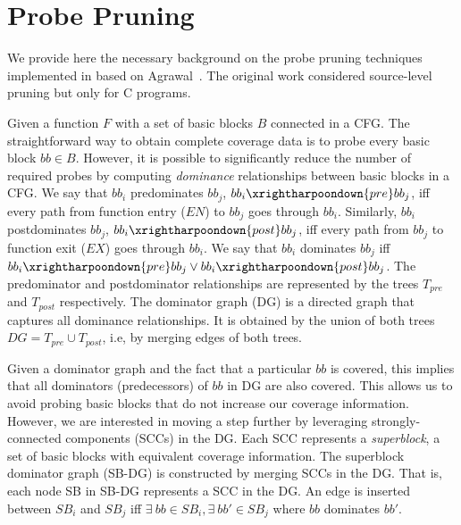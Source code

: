 
\section{Probe Pruning}
\label{sec:probe-pruning}

We provide here the necessary background on the probe pruning techniques implemented in {\bcov} based on Agrawal~\cite{Agrawal1994}. 
The original work considered source-level pruning but only for C programs.

Given a function $F$ with a set of basic blocks $B$ connected in a CFG. 
The straightforward way to obtain complete coverage data is to probe every basic block $bb \in B$. 
However, it is possible to significantly reduce the number of required probes by computing \textit{dominance} relationships between basic blocks in a CFG. 
We say that $bb_i$ predominates $bb_j$, $bb_i\xrightharpoondown{pre}bb_j $, iff every path from function entry ($EN$) to $bb_j$ goes through $bb_i$.
Similarly, $bb_i$ postdominates $bb_j$, $bb_i\xrightharpoondown{post}bb_j $, iff every path from $bb_j$ to function exit ($EX$) goes through $bb_i$. 
We say that $bb_i$ dominates $bb_j$ iff \mbox{$bb_i\xrightharpoondown{pre}bb_j \vee bb_i\xrightharpoondown{post}bb_j $}. 
The predominator and postdominator relationships are represented by the trees $T_{pre} $ and $T_{post} $ respectively. 
The dominator graph (DG) is a directed graph that captures all dominance relationships. 
It is obtained by the union of both trees  $DG = T_{pre} \cup T_{post} $, i.e,  by merging edges of both trees.


Given a dominator graph and the fact that a particular $bb$ is covered, this implies that all dominators (predecessors) of $bb$ in DG are also covered.
This allows us to avoid probing basic blocks that do not increase our coverage information.
However, we are interested in moving a step further by leveraging strongly-connected components (SCCs) in the DG.
Each SCC represents a \textit{superblock}, a set of basic blocks with equivalent coverage information.
The superblock dominator graph (SB-DG) is constructed by merging SCCs in the DG.
That is, each node SB in SB-DG represents a SCC in the DG. 
An edge is inserted between $SB_i$ and $SB_j$ iff  $\exists~bb \in SB_i, \exists~bb' \in SB_j$ where $bb$ dominates $bb'$.

